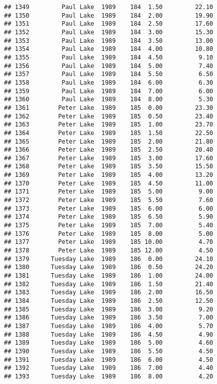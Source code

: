 \documentclass[
]{article}
\begin{document}
\begin{verbatim}
## 1349         Paul Lake  1989    184  1.50         22.10
## 1350         Paul Lake  1989    184  2.00         19.90
## 1351         Paul Lake  1989    184  2.50         17.60
## 1352         Paul Lake  1989    184  3.00         15.30
## 1353         Paul Lake  1989    184  3.50         13.00
## 1354         Paul Lake  1989    184  4.00         10.80
## 1355         Paul Lake  1989    184  4.50          9.10
## 1356         Paul Lake  1989    184  5.00          7.40
## 1357         Paul Lake  1989    184  5.50          6.50
## 1358         Paul Lake  1989    184  6.00          6.30
## 1359         Paul Lake  1989    184  7.00          6.00
## 1360         Paul Lake  1989    184  8.00          5.30
## 1361        Peter Lake  1989    185  0.00         23.30
## 1362        Peter Lake  1989    185  0.50         23.40
## 1363        Peter Lake  1989    185  1.00         23.70
## 1364        Peter Lake  1989    185  1.50         22.50
## 1365        Peter Lake  1989    185  2.00         21.80
## 1366        Peter Lake  1989    185  2.50         20.40
## 1367        Peter Lake  1989    185  3.00         17.60
## 1368        Peter Lake  1989    185  3.50         15.50
## 1369        Peter Lake  1989    185  4.00         13.20
## 1370        Peter Lake  1989    185  4.50         11.00
## 1371        Peter Lake  1989    185  5.00          9.00
## 1372        Peter Lake  1989    185  5.50          7.60
## 1373        Peter Lake  1989    185  6.00          6.00
## 1374        Peter Lake  1989    185  6.50          5.90
## 1375        Peter Lake  1989    185  7.00          5.40
## 1376        Peter Lake  1989    185  8.00          5.00
## 1377        Peter Lake  1989    185 10.00          4.70
## 1378        Peter Lake  1989    185 12.00          4.50
## 1379      Tuesday Lake  1989    186  0.00         24.10
## 1380      Tuesday Lake  1989    186  0.50         24.20
## 1381      Tuesday Lake  1989    186  1.00         24.00
## 1382      Tuesday Lake  1989    186  1.50         21.40
## 1383      Tuesday Lake  1989    186  2.00         16.50
## 1384      Tuesday Lake  1989    186  2.50         12.50
## 1385      Tuesday Lake  1989    186  3.00          9.20
## 1386      Tuesday Lake  1989    186  3.50          7.00
## 1387      Tuesday Lake  1989    186  4.00          5.70
## 1388      Tuesday Lake  1989    186  4.50          4.90
## 1389      Tuesday Lake  1989    186  5.00          4.60
## 1390      Tuesday Lake  1989    186  5.50          4.50
## 1391      Tuesday Lake  1989    186  6.00          4.50
## 1392      Tuesday Lake  1989    186  7.00          4.40
## 1393      Tuesday Lake  1989    186  8.00          4.20

\end{verbatim}
\end{document}

